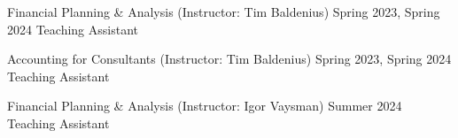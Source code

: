 

\begin{cventries}

\cventrysimple
    {Financial Planning \& Analysis (Instructor: Tim Baldenius)}  %
    {Spring 2023, Spring 2024} %
    {Teaching Assistant}
	
\cventrysimple
	{Accounting for Consultants (Instructor: Tim Baldenius)}  %
    {Spring 2023, Spring 2024} %
    {Teaching Assistant}
    
\cventrysimple
    {Financial Planning \& Analysis (Instructor: Igor Vaysman)}  %
    {Summer 2024} %
    {Teaching Assistant}

\end{cventries}
